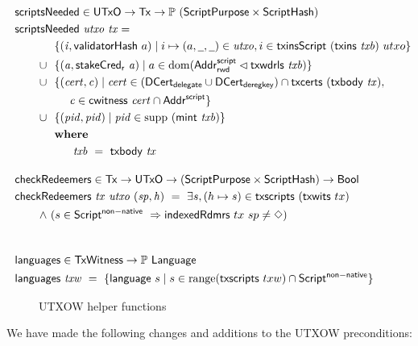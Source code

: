 \begin{figure}[htb]
  \begin{align*}
    & \hspace{-1cm}\fun{scriptsNeeded} \in \UTxO \to \Tx \to \powerset (\ScriptPurpose \times \ScriptHash) \\
    & \hspace{-1cm}\fun{scriptsNeeded}~\var{utxo}~\var{tx} = \\
    & ~~\{ (\var{i}, \fun{validatorHash}~a) \mid i \mapsto (a, \wcard, \wcard) \in \var{utxo},
      i\in\fun{txinsScript}~{(\fun{txins~\var{txb}})}~{utxo}\} \\
    \cup & ~~\{ (\var{a}, \fun{stakeCred_{r}}~\var{a}) \mid a \in \dom (\AddrRWDScr
           \restrictdom \fun{txwdrls}~\var{txb}) \} \\
    \cup & ~~\{ (\var{cert}, \var{c}) \mid \var{cert} \in (\DCertDeleg \cup \DCertDeRegKey)\cap\fun{txcerts}~(\txbody{tx}), \\
    & ~~~~~~\var{c} \in \cwitness{cert} \cap \AddrScr\} \\
      \cup & ~~\{ (\var{pid}, \var{pid}) \mid \var{pid} \in \supp~(\fun{mint}~\var{txb}) \} \\
    & \where \\
    & ~~~~~~~ \var{txb}~=~\txbody{tx}
    \nextdef
    & \hspace{-1cm}\fun{checkRedeemers} \in \Tx \to \UTxO \to (\ScriptPurpose \times \ScriptHash) \to \Bool \\
    & \hspace{-1cm}\fun{checkRedeemers}~\var{tx}~\var{utxo}~(\var{sp},\var{h})~=~ \exists s, (h\mapsto s) \in \fun{txscripts}~(\fun{txwits}~tx)\\
    \land & ~ (s \in \ScriptNonNative~\Rightarrow \fun{indexedRdmrs}~tx~sp \neq \Nothing) \\
    \nextdef
    & \hspace{-1cm}\fun{languages} \in \TxWitness \to \powerset{\Language} \\
    & \hspace{-1cm}\fun{languages}~\var{txw}~=~
      \{\fun{language}~s \mid s \in \range (\fun{txscripts}~{txw}) \cap \ScriptNonNative\}
  \end{align*}
  \caption{UTXOW helper functions}
  \label{fig:functions-witnesses}
\end{figure}

We have made the following changes and additions to the UTXOW preconditions:

